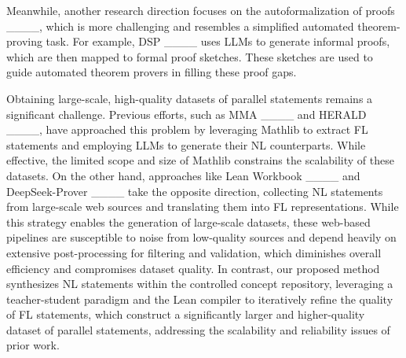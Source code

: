 Meanwhile, another research direction focuses on the autoformalization of proofs ____, which is more challenging and resembles a simplified automated theorem-proving task. For example, DSP ____ uses LLMs to generate informal proofs, which are then mapped to formal proof sketches. These sketches are used to guide automated  theorem provers in filling these proof gaps.

Obtaining large-scale, high-quality datasets of parallel statements remains a significant challenge. Previous efforts, such as MMA ____ and HERALD ____, have approached this problem by leveraging Mathlib to extract FL statements and employing LLMs to generate their NL counterparts. While effective, the limited scope and size of Mathlib constrains the scalability of these datasets. On the other hand, approaches like Lean Workbook ____ and DeepSeek-Prover ____ take the opposite direction, collecting NL statements from large-scale web sources and translating them into FL representations. While this strategy enables the generation of large-scale datasets, these web-based pipelines are susceptible to noise from low-quality sources and depend heavily on extensive post-processing for filtering and validation, which diminishes overall efficiency and compromises dataset quality. In contrast, our proposed method synthesizes NL statements within the controlled concept repository, leveraging a teacher-student paradigm and the Lean compiler to iteratively refine the quality of FL statements, which construct a significantly larger and higher-quality dataset of parallel statements, addressing the scalability and reliability issues of prior work.